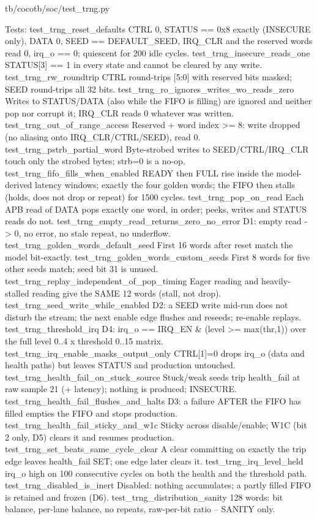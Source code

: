 \begin{relocated}{tb/cocotb/soc/test_trng.py}
\begin{textblock}
Tests:
test_trng_reset_defaults
CTRL 0, STATUS == 0x8 exactly (INSECURE only), DATA 0, SEED == DEFAULT_SEED, IRQ_CLR and the
reserved words read 0, irq_o == 0; quiescent for 200 idle cycles.
test_trng_insecure_reads_one
STATUS[3] == 1 in every state and cannot be cleared by any write.
test_trng_rw_roundtrip
CTRL round-trips [5:0] with reserved bits masked; SEED round-trips all 32 bits.
test_trng_ro_ignores_writes_wo_reads_zero
Writes to STATUS/DATA (also while the FIFO is filling) are ignored and neither pop nor
corrupt it; IRQ_CLR reads 0 whatever was written.
test_trng_out_of_range_access
Reserved + word index >= 8: write dropped (no aliasing onto IRQ_CLR/CTRL/SEED), read 0.
test_trng_pstrb_partial_word
Byte-strobed writes to SEED/CTRL/IRQ_CLR touch only the strobed bytes; strb=0 is a no-op.
test_trng_fifo_fills_when_enabled
READY then FULL rise inside the model-derived latency windows; exactly the four golden words;
the FIFO then stalls (holds, does not drop or repeat) for 1500 cycles.
test_trng_pop_on_read
Each APB read of DATA pops exactly one word, in order; peeks, writes and STATUS reads do not.
test_trng_empty_read_returns_zero_no_error
D1: empty read -> 0, no error, no stale repeat, no underflow.
test_trng_golden_words_default_seed
First 16 words after reset match the model bit-exactly.
test_trng_golden_words_custom_seeds
First 8 words for five other seeds match; seed bit 31 is unused.
test_trng_replay_independent_of_pop_timing
Eager reading and heavily-stalled reading give the SAME 12 words (stall, not drop).
test_trng_seed_write_while_enabled
D2: a SEED write mid-run does not disturb the stream; the next enable edge flushes and reseeds;
re-enable replays.
test_trng_threshold_irq
D4: irq_o == IRQ_EN & (level >= max(thr,1)) over the full level 0..4 x threshold 0..15 matrix.
test_trng_irq_enable_masks_output_only
CTRL[1]=0 drops irq_o (data and health paths) but leaves STATUS and production untouched.
test_trng_health_fail_on_stuck_source
Stuck/weak seeds trip health_fail at raw sample 21 (+ latency); nothing is produced; INSECURE.
test_trng_health_fail_flushes_and_halts
D3: a failure AFTER the FIFO has filled empties the FIFO and stops production.
test_trng_health_fail_sticky_and_w1c
Sticky across disable/enable; W1C (bit 2 only, D5) clears it and resumes production.
test_trng_set_beats_same_cycle_clear
A clear committing on exactly the trip edge leaves health_fail SET; one edge later clears it.
test_trng_irq_level_held
irq_o high on 100 consecutive cycles on both the health and the threshold path.
test_trng_disabled_is_inert
Disabled: nothing accumulates; a partly filled FIFO is retained and frozen (D6).
test_trng_distribution_sanity
128 words: bit balance, per-lane balance, no repeats, raw-per-bit ratio -- SANITY only.
\end{textblock}

\end{relocated}

